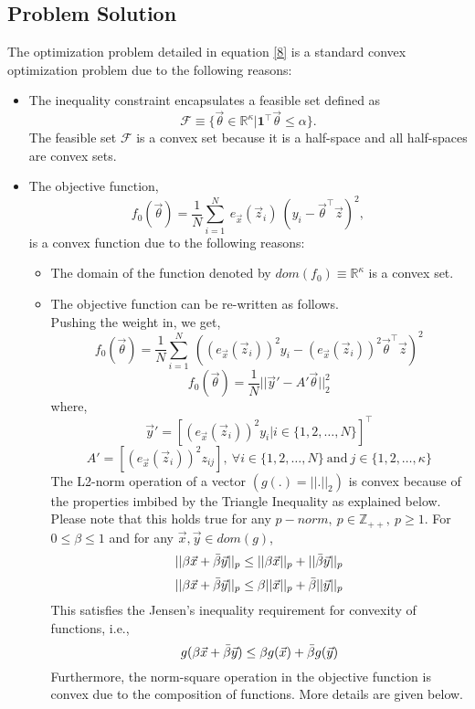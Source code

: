 \documentclass{article}
\begin{document}
\subsection{Problem Solution}
The optimization problem detailed in equation \eqref{8} is a standard convex optimization problem due to the following reasons:
\begin{itemize}
    \item The inequality constraint encapsulates a feasible set defined as \[\mathcal{F} \equiv \{\vec{\theta} \in \mathbb{R}^{\kappa} | \textbf{1}^\intercal \vec{\theta} \leq \alpha\}.\] The feasible set $\mathcal{F}$ is a convex set because it is a half-space and all half-spaces are convex sets.
    \item The objective function,
    \[f_0(\vec{\theta}) = \frac{1}{N} \sum_{i=1}^N\ e_{\vec{x}}(\vec{z}_i)\ (y_i - \vec{\theta}^\intercal \vec{z})^2,\] is a convex function due to the following reasons:
    \begin{itemize}
        \item The domain of the function denoted by $dom(f_0) \equiv \mathbb{R}^{\kappa}$ is a convex set.
        \item The objective function can be re-written as follows.
        \\Pushing the weight in, we get,
        \[f_0(\vec{\theta}) = \frac{1}{N} \sum_{i=1}^N\ ((e_{\vec{x}}(\vec{z}_i))^2 y_{i} - (e_{\vec{x}}(\vec{z}_i))^2 \vec{\theta}^\intercal \vec{z})^2\]
        \[f_0(\vec{\theta}) = \frac{1}{N} ||\vec{y}' - A'\vec{\theta}||_2^{2}\]
        where,
        \[\vec{y}' = [(e_{\vec{x}}(\vec{z}_i))^2 y_i | i \in \{1, 2, \dots, N\}]^\intercal\]
        \[A' = [(e_{\vec{x}}(\vec{z}_i))^2 z_{ij}],\ \forall i \in \{1, 2, \dots, N\}\ \text{and}\ j \in \{1, 2, \dots, \kappa\}\]
        The L2-norm operation of a vector $(g(.) = ||.||_2)$ is convex because of the properties imbibed by the Triangle Inequality as explained below. Please note that this holds true for any $p-norm,\ p \in \mathbb{Z}_{++},\ p \geq 1$.
        For $0 \leq \beta \leq 1$ and for any $\vec{x}, \vec{y} \in dom(g)$,
        \[||\beta \vec{x} + \Bar{\beta} \vec{y}||_p \leq ||\beta \vec{x}||_p + ||\Bar{\beta} \vec{y}||_p\]
        \[||\beta \vec{x} + \Bar{\beta} \vec{y}||_p \leq \beta||\vec{x}||_p + \Bar{\beta}||\vec{y}||_p\]
        This satisfies the Jensen's inequality requirement for convexity of functions, i.e.,
        \[g(\beta \vec{x} + \Bar{\beta} \vec{y}) \leq \beta g(\vec{x}) + \Bar{\beta} g(\vec{y})\]
        Furthermore, the norm-square operation in the objective function is convex due to the composition of functions. More details are given below.

\end{itemize}
\end{itemize}
\end{document}
